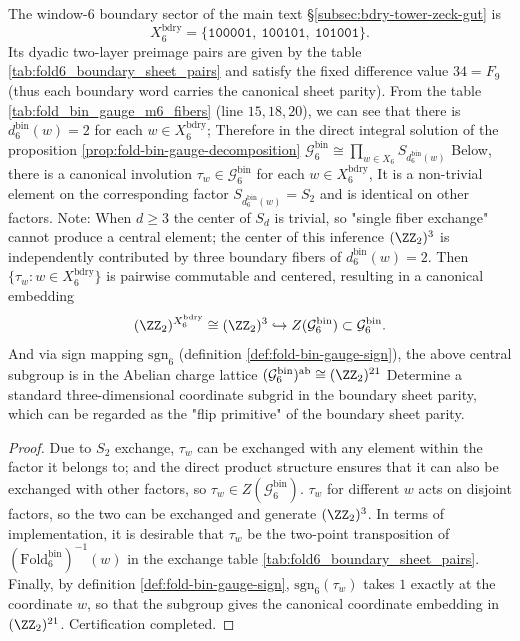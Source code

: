 \begin{corollary}\label{cor:fold-bin-boundary-center-z2}
The window-\(6\) boundary sector of the main text \S\ref{subsec:bdry-tower-zeck-gut} is
\[
X^{\mathrm{bdry}}_6=\{\texttt{100001},\ \texttt{100101},\ \texttt{101001}\}.
\]
Its dyadic two-layer preimage pairs are given by the table \ref{tab:fold6_boundary_sheet_pairs} and satisfy the fixed difference value \(34=F_9\) (thus each boundary word carries the canonical sheet parity).
From the table \ref{tab:fold_bin_gauge_m6_fibers} (line \(15,18,20\)), we can see that there is \(d^{\mathrm{bin}}_6(w)=2\) for each \(w\in X^{\mathrm{bdry}}_6\);
Therefore in the direct integral solution of the proposition \ref{prop:fold-bin-gauge-decomposition}
\(
\mathcal{G}^{\mathrm{bin}}_6\cong \prod_{w\in X_6}S_{d^{\mathrm{bin}}_6(w)}
\)
Below, there is a canonical involution \(\tau_w\in \mathcal{G}^{\mathrm{bin}}_6\) for each \(w\in X^{\mathrm{bdry}}_6\),
It is a non-trivial element on the corresponding factor \(S_{d^{\mathrm{bin}}_6(w)}=S_2\) and is identical on other factors.
Note: When \(d\ge 3\) the center of \(S_d\) is trivial, so "single fiber exchange" cannot produce a central element; the center of this inference \((\ZZ_2)^3\) is independently contributed by three boundary fibers of \(d^{\mathrm{bin}}_6(w)=2\).
Then \(\{\tau_w:w\in X^{\mathrm{bdry}}_6\}\) is pairwise commutable and centered, resulting in a canonical embedding
\[
(\ZZ_2)^{X^{\mathrm{bdry}}_6}\cong (\ZZ_2)^3\hookrightarrow Z(\mathcal{G}^{\mathrm{bin}}_6)\subset \mathcal{G}^{\mathrm{bin}}_6.
\]
And via sign mapping \(\mathrm{sgn}_6\) (definition \ref{def:fold-bin-gauge-sign}), the above central subgroup is in the Abelian charge lattice
\(
(\mathcal{G}^{\mathrm{bin}}_6)^{\mathrm{ab}}\cong (\ZZ_2)^{21}
\)
Determine a standard three-dimensional coordinate subgrid in the boundary sheet parity, which can be regarded as the "flip primitive" of the boundary sheet parity.
\end{corollary}
\begin{proof}
Due to \(S_2\) exchange, \(\tau_w\) can be exchanged with any element within the factor it belongs to; and the direct product structure ensures that it can also be exchanged with other factors, so \(\tau_w\in Z(\mathcal{G}^{\mathrm{bin}}_6)\).
\(\tau_w\) for different \(w\) acts on disjoint factors, so the two can be exchanged and generate \((\ZZ_2)^3\).
In terms of implementation, it is desirable that \(\tau_w\) be the two-point transposition of \((\mathrm{Fold}^{\mathrm{bin}}_6)^{-1}(w)\) in the exchange table \ref{tab:fold6_boundary_sheet_pairs}.
Finally, by definition \ref{def:fold-bin-gauge-sign}, \(\mathrm{sgn}_6(\tau_w)\) takes \(1\) exactly at the coordinate \(w\), so that the subgroup gives the canonical coordinate embedding in \((\ZZ_2)^{21}\). Certification completed.
\end{proof}

